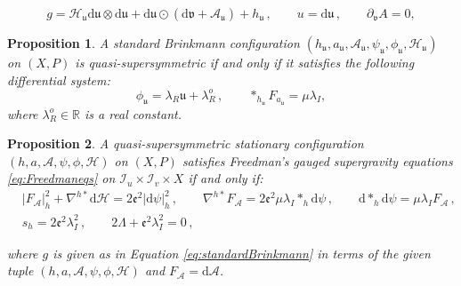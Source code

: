 \documentclass[10pt,a4paper]{amsart}
\newtheorem{prop}{Proposition}
\def\cA{\mathcal{A}}
\def\cH{\mathcal{H}}
\def\cI{\mathcal{I}}
\def\dd{\mathrm{d}}
\def\fru{\mathfrak{u}}
\def\frv{\mathfrak{v}}
\begin{document}
\begin{equation}
\label{eq:standardBrinkmann}
g = \cH_{\fru} \dd \fru \otimes \dd \fru +  \dd \fru \odot (\dd \frv + \cA_{\fru}) + h_{\fru}\, , \qquad  u = \dd \fru\, , \qquad \partial_{\frv}A = 0,
\end{equation}

\begin{prop}
\label{prop:brinkmannsusy}
A standard Brinkmann configuration $(h_{\fru}, a_{\fru}, \cA_{\fru}, \psi_{\fru}, \phi_{\fru}, \cH_{\fru})$ on $(X,P)$ is quasi-supersymmetric if and only if it satisfies the following differential system:
\begin{equation*}
\phi_{\fru} = \lambda_R \fru + \lambda_R^o \, , \qquad \ast_{h_{\fru}} F_{a_{\fru}} = \mu \lambda_I,
\end{equation*}
where $\lambda_R^o\in \mathbb{R}$ is a real constant.
\end{prop}

\begin{prop}
\label{prop:equivalentBrinkmann}
A quasi-supersymmetric stationary configuration  $(h, a, \cA, \psi, \phi, \cH)$ on $(X,P)$ satisfies Freedman's gauged supergravity equations \eqref{eq:Freedmaneqs} on $\cI_u\times \cI_v\times X$ if and only if:
\begin{eqnarray*}
& \vert F_{\cA}\vert^2_{h} + \nabla^{h\ast}\dd \cH     =   2 \mathfrak{e}^2 \vert \dd \psi\vert^2_h \, , \qquad \nabla^{h\ast} F_{\cA}   =     2 \mathfrak{e}^2 \mu \lambda_I \ast_h \dd\psi \, , \qquad \dd\ast_h \dd \psi   = \mu\lambda_I F_{\cA}\, ,\\
&   s_h = 2 \mathfrak{e}^2 \lambda_I^2\, , \qquad    2 \Lambda  +  \mathfrak{e}^2 \lambda_I^2 = 0\, ,
\end{eqnarray*}

\noindent
where $g$ is given as in Equation \eqref{eq:standardBrinkmann} in terms of the given tuple $(h, a, \cA, \psi, \phi, \cH)$ and $F_{\cA} = \dd\cA$.
\end{prop}
\end{document}
